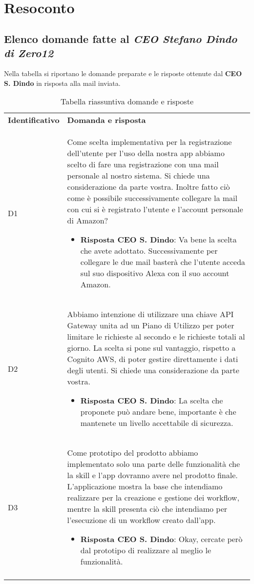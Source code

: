\clearpage
\section{Resoconto}
	\subsection{Elenco domande fatte al \emph{CEO Stefano Dindo di Zero12}}
	\label{sec:elenco}
	Nella tabella si riportano le domande preparate e le risposte ottenute dal \textbf{CEO S. Dindo} in risposta alla mail inviata.
		\begin{center}
			\renewcommand{\arraystretch}{1.5}
			\begin{longtable}{  p{2.5cm} p{11.7cm} }
				\rowcolor{tableHeadYellow}
				\textbf{Identificativo}&\textbf{Domanda e risposta}\\
				D1 & Come scelta implementativa per la registrazione dell'utente per l'uso della nostra app abbiamo scelto di fare una registrazione con una mail personale al nostro sistema. Si chiede una considerazione da parte vostra. Inoltre fatto ciò come è possibile successivamente collegare la mail con cui si è registrato l'utente e l'account personale di Amazon?
				\begin{itemize}
					\item \textbf{Risposta CEO S. Dindo}: Va bene la scelta che avete adottato. Successivamente per collegare le due mail basterà che l'utente acceda sul suo dispositivo Alexa con il suo account Amazon.
				\end{itemize}
				\\
				D2 & Abbiamo intenzione di utilizzare una chiave API Gateway unita ad un Piano di Utilizzo per poter limitare le richieste al secondo e le richieste totali al giorno. La scelta si pone sul vantaggio, rispetto a Cognito AWS, di poter gestire direttamente i dati degli utenti. Si chiede una considerazione da parte vostra.
				\begin{itemize}
					\item \textbf{Risposta CEO S. Dindo}: La scelta che proponete può andare bene, importante è che mantenete un livello accettabile di sicurezza.
				\end{itemize}
				\\
				D3 & Come prototipo del prodotto abbiamo implementato solo una parte delle funzionalità che la skill e l'app dovranno avere nel prodotto finale. L'applicazione mostra la base che intendiamo realizzare per la creazione e gestione dei workflow, mentre la skill presenta ciò che intendiamo per l'esecuzione di un workflow creato dall'app.
				\begin{itemize}
					\item \textbf{Risposta CEO S. Dindo}: Okay, cercate però dal prototipo di realizzare al meglio le funzionalità.
				\end{itemize}
				\\
				\rowcolor{white}
				\caption{Tabella riassuntiva domande e risposte}
			\end{longtable}	
		\end{center}
	
	
